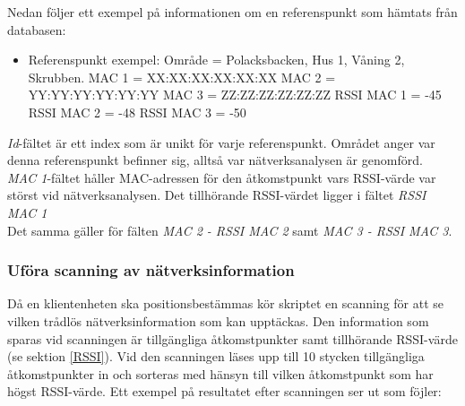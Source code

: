 \documentclass[swedish, a4paper,12pt]{article}
\begin{document}
Nedan följer ett exempel på informationen om en referenspunkt som hämtats från databasen:
\begin{itemize}
  \item Referenspunkt exempel:
        \newline Område = Polacksbacken, Hus 1, Våning 2, Skrubben.
        \newline MAC 1 = XX:XX:XX:XX:XX:XX
        \newline MAC 2 = YY:YY:YY:YY:YY:YY
        \newline MAC 3 = ZZ:ZZ:ZZ:ZZ:ZZ:ZZ
        \newline RSSI MAC 1 = -45
        \newline RSSI MAC 2 = -48
        \newline RSSI MAC 3 = -50
\end{itemize}

\textit{Id}-fältet är ett index som är unikt för varje referenspunkt. %
Området anger var denna referenspunkt befinner sig, alltså var nätverksanalysen är genomförd. \\
\textit{MAC 1}-fältet håller MAC-adressen för den åtkomstpunkt vars RSSI-värde var störst vid nätverksanalysen. Det tillhörande RSSI-värdet ligger i fältet \textit{RSSI MAC 1}\\
Det samma gäller för fälten \textit{MAC 2 - RSSI MAC 2} samt \textit{MAC 3 - RSSI MAC 3}.

\subsubsection{Uföra scanning av nätverksinformation} \label{scanning}
Då en klientenheten ska positionsbestämmas kör skriptet en scanning för att se vilken trådlös nätverksinformation som kan upptäckas. Den information som sparas vid scanningen är tillgängliga åtkomstpunkter samt tillhörande RSSI-värde (se sektion \ref{RSSI}). Vid den scanningen läses upp till 10 stycken tillgängliga åtkomstpunkter %
in och sorteras med hänsyn till vilken åtkomstpunkt som har högst RSSI-värde. Ett exempel på resultatet efter scanningen ser ut som föjler:
\end{document}
